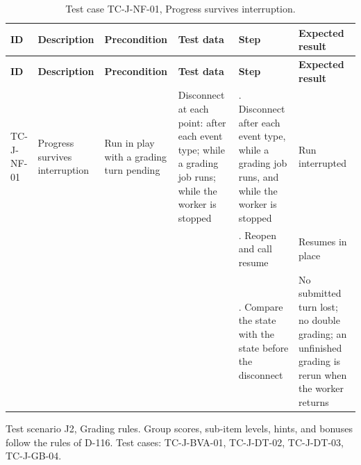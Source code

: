 {\footnotesize{}\renewcommand{\arraystretch}{1.1}
\begin{longtable}{|>{\raggedright\arraybackslash}p{}|>{\raggedright\arraybackslash}p{}|>{\raggedright\arraybackslash}p{}|>{\raggedright\arraybackslash}p{}|>{\raggedright\arraybackslash}p{}|>{\raggedright\arraybackslash}p{}|}
\caption{Test case TC-J-NF-01, Progress survives interruption.} \\
\hline
\textbf{ID} & \textbf{Description} & \textbf{Precondition} & \textbf{Test data} & \textbf{Step} & \textbf{Expected result} \\ \hline
\endfirsthead
\hline
\textbf{ID} & \textbf{Description} & \textbf{Precondition} & \textbf{Test data} & \textbf{Step} & \textbf{Expected result} \\ \hline
\endhead
TC-J-NF-01 & Progress survives interruption & Run in play with a grading turn pending & Disconnect at each point: after each event type; while a grading job runs; while the worker is stopped & 1. Disconnect after each event type, while a grading job runs, and while the worker is stopped & Run interrupted \\ \cline{5-6}
 &  &  &  & 2. Reopen and call resume & Resumes in place \\ \cline{5-6}
 &  &  &  & 3. Compare the state with the state before the disconnect & No submitted turn lost; no double grading; an unfinished grading is rerun when the worker returns \\ \hline
\end{longtable}
}

Test scenario J2, Grading rules. Group scores, sub-item levels, hints, and bonuses follow the rules of D-116. Test cases: TC-\allowbreak{}J-\allowbreak{}BVA-\allowbreak{}01, TC-J-DT-02, TC-J-DT-03, TC-J-GB-04.

